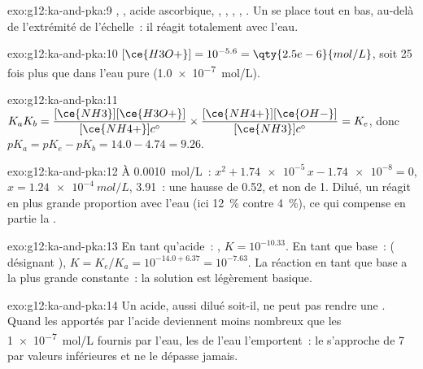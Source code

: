 \begin{solution}{exo:g12:ka-and-pka:9}
, , acide ascorbique, , ,
, , . Un  se place tout en bas,
au-delà de l'extrémité de l'échelle~: il réagit totalement avec l'eau.
\end{solution}

\begin{solution}{exo:g12:ka-and-pka:10}
$[\ce{H3O+}] = 10^{-5.6} = \qty{2.5e-6}{mol/L}$, soit 25 fois plus que
dans l'eau pure (\qty{1.0e-7}{mol/L}).
\end{solution}

\begin{solution}{exo:g12:ka-and-pka:11}
$K_a K_b = \dfrac{[\ce{NH3}][\ce{H3O+}]}{[\ce{NH4+}]c^\circ} \times
\dfrac{[\ce{NH4+}][\ce{OH-}]}{[\ce{NH3}]c^\circ} = K_e$, donc
$pK_a = pK_e - pK_b = 14.0 - 4.74 = 9.26$.
\end{solution}

\begin{solution}{exo:g12:ka-and-pka:12}
À \qty{0.0010}{mol/L}~: $x^2 + \num{1.74e-5}\,x - \num{1.74e-8} = 0$,
$x = \qty{1.24e-4}{mol/L}$,  3.91~: une hausse de 0.52, et non de 1.
Dilué, un  réagit en plus grande proportion avec l'eau (ici
\qty{12}{\percent} contre \qty{4}{\percent}), ce qui compense en partie
la .
\end{solution}

\begin{solution}{exo:g12:ka-and-pka:13}
En tant qu'acide~: , $K = 10^{-10.33}$. En tant que
base~:  ( désignant ), $K = K_e/K_a = 10^{-14.0+6.37}
= 10^{-7.63}$. La réaction en tant que base a la plus grande
constante~: la solution est légèrement basique.
\end{solution}

\begin{solution}{exo:g12:ka-and-pka:14}
Un acide, aussi dilué soit-il, ne peut pas rendre une .
Quand les  apportés par l'acide deviennent moins nombreux
que les \qty{1e-7}{mol/L} fournis par l'eau, les  de l'eau
l'emportent~: le  s'approche de 7 par valeurs inférieures et ne le
dépasse jamais.
\end{solution}


